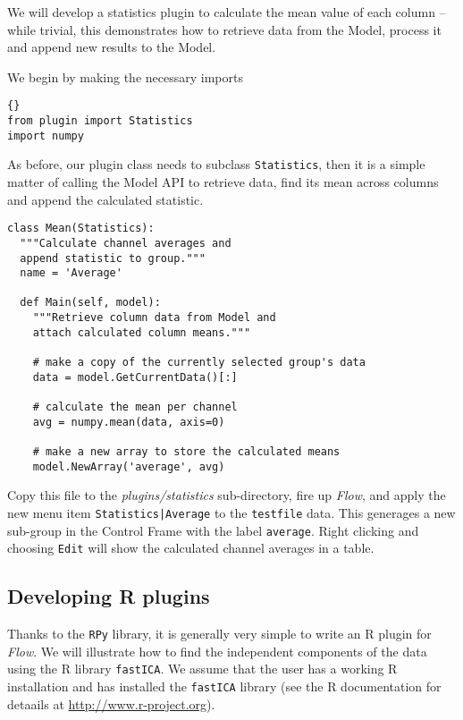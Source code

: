 \documentclass{article}
\begin{document}
We will develop a statistics plugin to calculate the mean value of
each column -- while trivial, this demonstrates how to retrieve data
from the Model, process it and append new results to the Model.

We begin by making the necessary imports

\begin{lstlisting}[]{}
from plugin import Statistics
import numpy
\end{lstlisting}

As before, our plugin class needs to subclass \texttt{Statistics},
then it is a simple matter of calling the Model API to retrieve data,
find its mean across columns and append the calculated statistic.

\begin{lstlisting}
class Mean(Statistics):
  """Calculate channel averages and 
  append statistic to group."""
  name = 'Average'

  def Main(self, model):
    """Retrieve column data from Model and 
    attach calculated column means."""

    # make a copy of the currently selected group's data
    data = model.GetCurrentData()[:]

    # calculate the mean per channel
    avg = numpy.mean(data, axis=0)

    # make a new array to store the calculated means
    model.NewArray('average', avg)

\end{lstlisting}

Copy this file to the \emph{plugins/statistics} sub-directory, fire up
\emph{Flow}, and apply the new menu item \texttt{Statistics|Average}
to the \texttt{testfile} data. This generages a new sub-group in the
Control Frame with the label \texttt{average}. Right clicking and
choosing \texttt{Edit} will show the calculated channel averages in a
table.

\subsection*{Developing R plugins}

Thanks to the \texttt{RPy} library, it is generally very simple to
write an R plugin for \emph{Flow}. We will illustrate how to find the
independent components of the data using the R library
\texttt{fastICA}. We assume that the user has a working R installation
and has installed the \texttt{fastICA} library (see the R
documentation for detaails at \url{http://www.r-project.org}).
\end{document}
